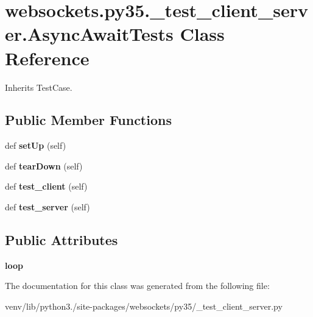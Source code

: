 \hypertarget{classwebsockets_1_1py35_1_1__test__client__server_1_1_async_await_tests}{}\section{websockets.\+py35.\+\_\+test\+\_\+client\+\_\+server.\+Async\+Await\+Tests Class Reference}
\label{classwebsockets_1_1py35_1_1__test__client__server_1_1_async_await_tests}


Inherits Test\+Case.

\subsection*{Public Member Functions}
\begin{DoxyCompactItemize}
\item 
\mbox{\label{classwebsockets_1_1py35_1_1__test__client__server_1_1_async_await_tests_aaaf6cf737c748be65f36c05f6818d15c}} 
def {\bfseries set\+Up} (self)
\item 
\mbox{\label{classwebsockets_1_1py35_1_1__test__client__server_1_1_async_await_tests_afbd8ff216a6f7b6e3e066abd05133aa8}} 
def {\bfseries tear\+Down} (self)
\item 
\mbox{\label{classwebsockets_1_1py35_1_1__test__client__server_1_1_async_await_tests_ac73fe56abedac28d112a127984e879c7}} 
def {\bfseries test\+\_\+client} (self)
\item 
\mbox{\label{classwebsockets_1_1py35_1_1__test__client__server_1_1_async_await_tests_aa91012dfbb9ee755f472a2ec9f475222}} 
def {\bfseries test\+\_\+server} (self)
\end{DoxyCompactItemize}
\subsection*{Public Attributes}
\begin{DoxyCompactItemize}
\item 
\mbox{\label{classwebsockets_1_1py35_1_1__test__client__server_1_1_async_await_tests_af0f5ced33ac348c05015206d3f6ad71a}} 
{\bfseries loop}
\end{DoxyCompactItemize}


The documentation for this class was generated from the following file\+:\begin{DoxyCompactItemize}
\item 
venv/lib/python3./site-\/packages/websockets/py35/\+\_\+test\+\_\+client\+\_\+server.\+py\end{DoxyCompactItemize}
